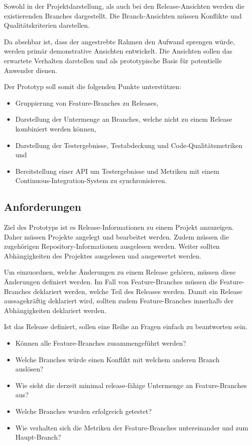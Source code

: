 Sowohl in der Projektdarstellung, als auch bei den Release-Ansichten werden die existierenden Branches dargestellt. Die Branch-Ansichten müssen Konflikte und Qualitätskriterien darstellen.

Da absehbar ist, dass der angestrebte Rahmen den Aufwand sprengen würde, werden primär demonstrative Ansichten entwickelt. Die Ansichten sollen das erwartete Verhalten darstellen und als prototypische Basis für potentielle Anwender dienen.

Der Prototyp soll somit die folgenden Punkte unterstützen:
\begin{itemize}
\item Gruppierung von Feature-Branches zu Releases,
\item Darstellung der Untermenge an Branches, welche nicht zu einem Release kombiniert werden können,
\item Darstellung der Testergebnisse, Testabdeckung und Code-Qualitätsmetriken und
\item Bereitstellung einer API um Testergebnisse und Metriken mit einem Continuous-Integration-System zu synchronisieren.
\end{itemize}

\subsection{Anforderungen}

Ziel des Prototyps ist es Release-Informationen zu einem Projekt anzuzeigen. Daher müssen Projekte angelegt und bearbeitet werden. Zudem müssen die zugehörigen Repository-Informationen ausgelesen werden. Weiter sollten Abhängigkeiten des Projektes ausgelesen und ausgewertet werden. 

Um einzuordnen, welche Änderungen zu einem Release gehören, müssen diese Änderungen definiert werden. Im Fall von Feature-Branches müssen die Feature-Branches deklariert werden, welche Teil des Releases werden. Damit ein Release aussagekräftig deklariert wird, sollten zudem Feature-Branches innerhalb der Abhängigkeiten deklariert werden.

Ist das Release definiert, sollen eine Reihe an Fragen einfach zu beantworten sein. 
\begin{itemize}
\item Können alle Feature-Branches zusammengeführt werden?
\item Welche Branches würde einen Konflikt mit welchem anderen Branch auslösen?
\item Wie sieht die derzeit minimal release-fähige Untermenge an Feature-Branches aus?
\item Welche Branches wurden erfolgreich getestet?
\item Wie verhalten sich die Metriken der Feature-Branches untereinander und zum Haupt-Branch?
\end{itemize}

